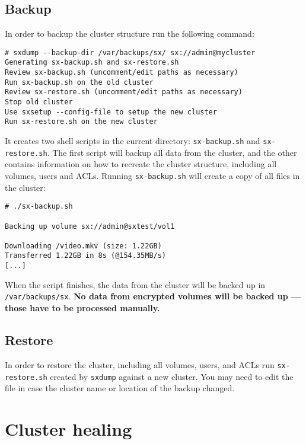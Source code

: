 \subsection{Backup}
In order to backup the cluster structure run the following command:
\begin{lstlisting}
# sxdump --backup-dir /var/backups/sx/ sx://admin@mycluster
Generating sx-backup.sh and sx-restore.sh
Review sx-backup.sh (uncomment/edit paths as necessary)
Run sx-backup.sh on the old cluster
Review sx-restore.sh (uncomment/edit paths as necessary)
Stop old cluster
Use sxsetup --config-file to setup the new cluster
Run sx-restore.sh on the new cluster
\end{lstlisting}
It creates two shell scripts in the current directory: \verb+sx-backup.sh+ and
\verb+sx-restore.sh+. The first script will backup all data from the cluster,
and the other contains information on how to recreate the cluster structure,
including all volumes, users and ACLs. Running \verb+sx-backup.sh+ will create
a copy of all files in the cluster:
\begin{lstlisting}
# ./sx-backup.sh

Backing up volume sx://admin@sxtest/vol1

Downloading /video.mkv (size: 1.22GB)
Transferred 1.22GB in 8s (@154.35MB/s)           
[...]
\end{lstlisting}
When the script finishes, the data from the cluster will be backed up
in \verb+/var/backups/sx+. \textbf{No data from encrypted volumes will be
backed up --- those have to be processed manually.}

\subsection{Restore}
In order to restore the cluster, including all volumes, users, and ACLs run
\verb+sx-restore.sh+ created by \verb+sxdump+ against a new cluster. You may
need to edit the file in case the cluster name or location of the backup changed.

\section{Cluster healing}

